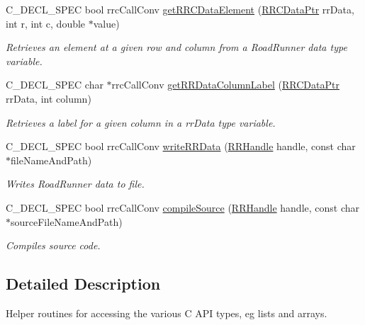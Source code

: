 \begin{DoxyCompactItemize}
C\+\_\+\+D\+E\+C\+L\+\_\+\+S\+P\+E\+C bool rrc\+Call\+Conv \hyperlink{group__helper_routines_gac62debe5a133f63fb3ebe6da3745693c}{get\+R\+R\+C\+Data\+Element} (\hyperlink{rrc__types_8h_a9da8b124eb9c3c0045f8926c6a420b4a}{R\+R\+C\+Data\+Ptr} rr\+Data, int r, int c, double $\ast$value)
\begin{DoxyCompactList}\small\item\em Retrieves an element at a given row and column from a Road\+Runner data type variable. \end{DoxyCompactList}\item 
C\+\_\+\+D\+E\+C\+L\+\_\+\+S\+P\+E\+C char $\ast$rrc\+Call\+Conv \hyperlink{group__helper_routines_gaaa98160597f72e56bf32eff95e7b1f0c}{get\+R\+R\+Data\+Column\+Label} (\hyperlink{rrc__types_8h_a9da8b124eb9c3c0045f8926c6a420b4a}{R\+R\+C\+Data\+Ptr} rr\+Data, int column)
\begin{DoxyCompactList}\small\item\em Retrieves a label for a given column in a rr\+Data type variable. \end{DoxyCompactList}\item 
C\+\_\+\+D\+E\+C\+L\+\_\+\+S\+P\+E\+C bool rrc\+Call\+Conv \hyperlink{group__helper_routines_ga63cba386b98dc030461d2c5e94bdab76}{write\+R\+R\+Data} (\hyperlink{rrc__types_8h_a1d68f0592372208fa5a5f2799ea4b3ae}{R\+R\+Handle} handle, const char $\ast$file\+Name\+And\+Path)
\begin{DoxyCompactList}\small\item\em Writes Road\+Runner data to file. \end{DoxyCompactList}\item 
C\+\_\+\+D\+E\+C\+L\+\_\+\+S\+P\+E\+C bool rrc\+Call\+Conv \hyperlink{group__helper_routines_ga51ea8512eff69dc08b825c209914d11a}{compile\+Source} (\hyperlink{rrc__types_8h_a1d68f0592372208fa5a5f2799ea4b3ae}{R\+R\+Handle} handle, const char $\ast$source\+File\+Name\+And\+Path)
\begin{DoxyCompactList}\small\item\em Compiles source code. \end{DoxyCompactList}\end{DoxyCompactItemize}


\subsection{Detailed Description}
Helper routines for accessing the various C A\+P\+I types, eg lists and arrays. 



